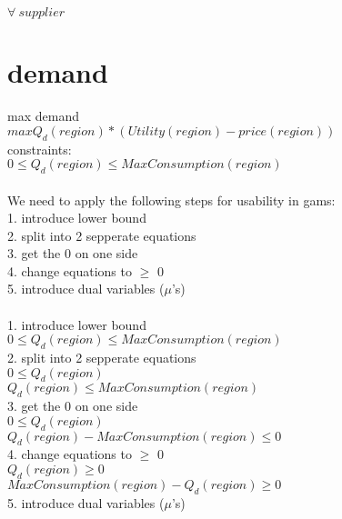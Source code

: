 \documentclass{article}
\begin{document}
\quad$\forall \:supplier$\\



\section*{demand}
max demand\\
\quad $max Q_{d}(region) * (Utility(region)-price(region))$\\
constraints:\\
\quad $0\leq Q_d(region) \leq MaxConsumption(region)$\\
\hfill\\
We need to apply the following steps for usability in gams:\\
1. introduce lower bound\\
2. split into 2 sepperate equations\\
3. get the 0 on one side\\
4. change equations to $\geq$ 0\\
5. introduce dual variables ($\mu$'s)\\
\hfill\\
1. introduce lower bound\\
\quad $0\leq Q_d(region) \leq MaxConsumption(region)$\\
2. split into 2 sepperate equations\\
\quad $0\leq Q_d(region)$\\
\quad $Q_d(region) \leq MaxConsumption(region)$\\
3. get the 0 on one side\\
\quad $0\leq Q_d(region)$\\
\quad $Q_d(region) - MaxConsumption(region) \leq 0$\\
4. change equations to $\geq$ 0\\
\quad $Q_d(region) \geq 0$\\
\quad $ MaxConsumption(region) - Q_d(region)\geq 0$\\
5. introduce dual variables ($\mu$'s)\\
\end{document}

